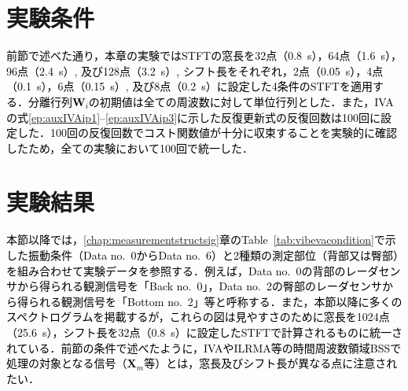 \section{実験条件}
\label{sec:conv:expcondition4}
\textcolor{black}{前節で述べた通り，本章の実験ではSTFTの窓長を32点（0.8~s），64点（1.6~s），96点（2.4~s）, 及び128点（3.2~s）, シフト長をそれぞれ，2点（0.05~s），4点（0.1~s），6点（0.15~s）, 及び8点（0.2~s）に設定した4条件のSTFTを適用する．分離行列$\bm{W}_{i}$の初期値は全ての周波数に対して単位行列とした．また，IVAの式\eqref{ep:auxIVAip1}--\eqref{ep:auxIVAip3}に示した反復更新式の反復回数は100回に設定した．100回の反復回数でコスト関数値が十分に収束することを実験的に確認したため，全ての実験において100回で統一した．}

\section{実験結果}
\label{sec:conv:expresult4}

\textcolor{black}{本節以降では，\ref{chap:measurementstructsig}章のTable~\ref{tab:vibevacondition}で示した振動条件（Data no.~0からData no.~6）と2種類の測定部位（背部又は臀部）を組み合わせて実験データを参照する．例えば，Data no.~0の背部のレーダセンサから得られる観測信号を「Back no.~0」，Data no.~2の臀部のレーダセンサから得られる観測信号を「Bottom no.~2」等と呼称する．また，本節以降に多くのスペクトログラムを掲載するが，これらの図は見やすさのために窓長を1024点（25.6~s），シフト長を32点（0.8~s）に設定したSTFTで計算されるものに統一されている．前節の条件で述べたように，IVAやILRMA等の時間周波数領域BSSで処理の対象となる信号（$\bm{X}_m$等）とは，窓長及びシフト長が異なる点に注意されたい．}

